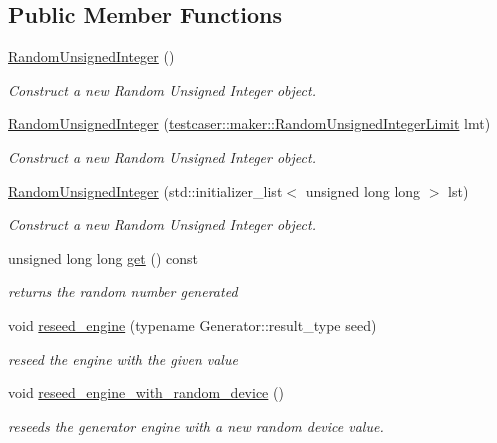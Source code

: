 \subsection*{Public Member Functions}
\begin{DoxyCompactItemize}
\item 
\mbox{\hyperlink{classtestcaser_1_1maker_1_1types_1_1RandomUnsignedInteger_ad137a635f13a3b61529355643de3874f}{Random\+Unsigned\+Integer}} ()
\begin{DoxyCompactList}\small\item\em Construct a new Random Unsigned Integer object. \end{DoxyCompactList}\item 
\mbox{\hyperlink{classtestcaser_1_1maker_1_1types_1_1RandomUnsignedInteger_a9f4184392f1842553d062f2d0f668ae2}{Random\+Unsigned\+Integer}} (\mbox{\hyperlink{classtestcaser_1_1maker_1_1RandomUnsignedIntegerLimit}{testcaser\+::maker\+::\+Random\+Unsigned\+Integer\+Limit}} lmt)
\begin{DoxyCompactList}\small\item\em Construct a new Random Unsigned Integer object. \end{DoxyCompactList}\item 
\mbox{\hyperlink{classtestcaser_1_1maker_1_1types_1_1RandomUnsignedInteger_a485a3c55c963dbfd1fca8b62214f78ad}{Random\+Unsigned\+Integer}} (std\+::initializer\+\_\+list$<$ unsigned long long $>$ lst)
\begin{DoxyCompactList}\small\item\em Construct a new Random Unsigned Integer object. \end{DoxyCompactList}\item 
unsigned long long \mbox{\hyperlink{classtestcaser_1_1maker_1_1types_1_1RandomUnsignedInteger_a73504939f740445d56b0bd00257f5480}{get}} () const
\begin{DoxyCompactList}\small\item\em returns the random number generated \end{DoxyCompactList}\item 
void \mbox{\hyperlink{classtestcaser_1_1maker_1_1types_1_1RandomUnsignedInteger_ac0ec747e5fe2701bd3533866e97ffcf7}{reseed\+\_\+engine}} (typename Generator\+::result\+\_\+type seed)
\begin{DoxyCompactList}\small\item\em reseed the engine with the given value \end{DoxyCompactList}\item 
void \mbox{\hyperlink{classtestcaser_1_1maker_1_1types_1_1RandomUnsignedInteger_acd7ff23154cf792b11d8344d091100fe}{reseed\+\_\+engine\+\_\+with\+\_\+random\+\_\+device}} ()
\begin{DoxyCompactList}\small\item\em reseeds the generator engine with a new random device value. \end{DoxyCompactList}\end{DoxyCompactItemize}


